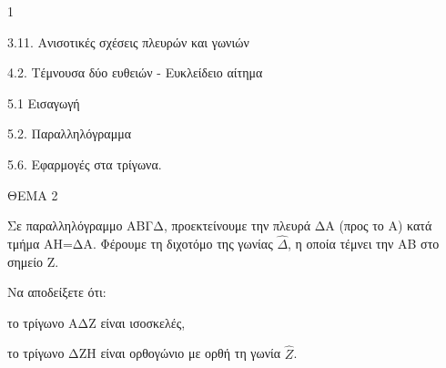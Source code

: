 \begin{ylh}{1}
    \item 3.11. Ανισοτικές σχέσεις πλευρών και γωνιών
    \item 4.2. Τέμνουσα δύο ευθειών - Ευκλείδειο αίτημα
    \item 5.1 Εισαγωγή
    \item 5.2. Παραλληλόγραμμα
    \item 5.6. Εφαρμογές στα τρίγωνα.
\end{ylh}

ΘΕΜΑ 2

Σε παραλληλόγραμμο ΑΒΓΔ, προεκτείνουμε την πλευρά ΔΑ (προς το Α) κατά τμήμα ΑΗ=ΔΑ. Φέρουμε τη διχοτόμο της γωνίας $\widehat{\Delta}$, η οποία τέμνει την ΑΒ στο σημείο Ζ.

Να αποδείξετε ότι:

\begin{alist}
\item το τρίγωνο ΑΔΖ είναι ισοσκελές, 

\item το τρίγωνο ΔΖΗ είναι ορθογώνιο με ορθή τη γωνία $\widehat{Ζ}$. 

\begin{center}
\end{center}
\end{alist}
